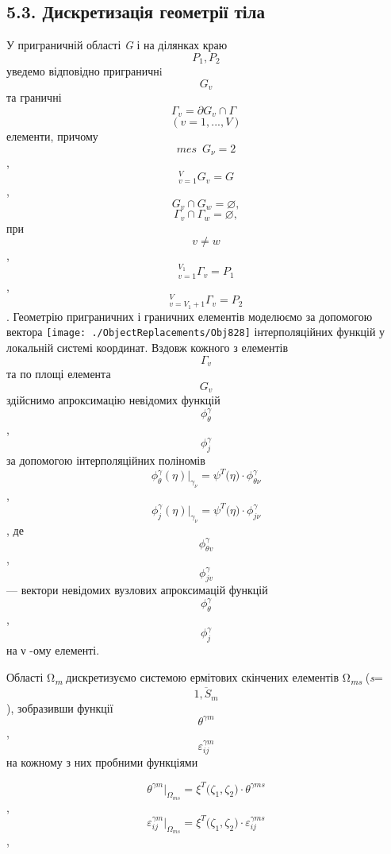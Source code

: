 \hypertarget{ux434ux438ux441ux43aux440ux435ux442ux438ux437ux430ux446ux456ux44f-ux433ux435ux43eux43cux435ux442ux440ux456ux457-ux442ux456ux43bux430-1}{%
\subsection[5.3. Дискретизація геометрії
тіла]{\texorpdfstring{\protect\hypertarget{anchor-63}{}{}5.3.
Дискретизація геометрії
тіла}{5.3. Дискретизація геометрії тіла}}\label{ux434ux438ux441ux43aux440ux435ux442ux438ux437ux430ux446ux456ux44f-ux433ux435ux43eux43cux435ux442ux440ux456ux457-ux442ux456ux43bux430-1}}

У приграничній області \emph{G} і на ділянках краю
\[{P_{1},P_{2}}{}\]\textsubscript{ }уведемо відповідно пригра­нич­нi
\[G_{v}{}\] та граничні
\[{{\Gamma_{v} = \partial}{G_{v} \cap \Gamma}\mspace{9mu}}{}\]\[{({v = 1},\text{.}\text{.}\text{.},V)}{}\]\textsubscript{
}елементи, при­чому
\[{\mathit{\text{mes}}\mspace{9mu}{G_{\nu} = 2}}{}\],
\[{{}_{v = 1}^{V}{G_{v} = G}}{}\],
\[{{{G_{v} \cap G_{w}} = \varnothing},}{}\]
\[{{{\Gamma_{v} \cap \Gamma_{w}} = \varnothing},}{}\] при
\[{v \neq w}{}\], \[{{}_{v = 1}^{V_{1}}\Gamma_{v}{= P_{1}}}{}\],
\[{{}_{v = {V_{1} + 1}}^{V}\Gamma_{v}{= P_{2}}}{}\]. Геометрію
приграничних і граничних елементів моделюємо за допомогою вектора
\texttt{[image: ./ObjectReplacements/Obj828]}
інтерполяційних функцій у локальній системі координат. Вздовж кожного з
елементів \[\Gamma_{v}{}\] та по площі елемента
\[G_{v}{}\]\textsubscript{ }здійснимо апроксимацію невідомих функцій
\[\phi_{\theta}^{\gamma}{}\], \[\phi_{j}^{\gamma}{}\] за допомогою
інтерполяційних поліномів
\[{\phi_{\theta}^{\gamma}(\eta){|_{\gamma_{\nu}} = \psi^{T}}{(\eta{) \cdot \phi_{\mathit{\text{θν}}}^{\gamma}}}}{}\],
\[{\phi_{j}^{\gamma}(\eta){|_{\gamma_{\nu}} = \psi^{T}}{(\eta{) \cdot \phi_{\mathit{j\nu}}^{\gamma}}}}{}\],
де \[\phi_{\mathit{\theta v}}^{\gamma}{}\],
\[\phi_{\mathit{\text{jv}}}^{\gamma}{}\] --- вектори невідомих вузлових
апроксимацій функцій \[\phi_{\theta}^{\gamma}{}\],
\[\phi_{j}^{\gamma}{}\] на ν -ому елементі.

Області Ω\textsubscript{\emph{m}} дискретизуємо системою ермітових
скінчених елементів Ω\textsubscript{\emph{ms}}
(\emph{s}=\[\overline{1,S_{m}}{}\]), зобразивши функції
\[\theta^{\mathit{\gamma m}}{}\],
\[\varepsilon_{\mathit{\text{ij}}}^{\mathit{\gamma m}}{}\] на кожному з
них пробними функціями

\[{\theta^{\mathit{\gamma m}}{|_{\Omega_{\mathit{\text{ms}}}} = \xi^{T}}{(\zeta_{1}}{,\zeta_{2}}{) \cdot \theta^{\gamma\mathit{\text{ms}}}}}{}\],
\[{\varepsilon_{\mathit{\text{ij}}}^{\mathit{\gamma m}}{|_{\Omega_{\mathit{\text{ms}}}} = \xi^{T}}{(\zeta_{1}}{,\zeta_{2}}{) \cdot \varepsilon_{\mathit{\text{ij}}}^{\gamma\mathit{\text{ms}}}}}{}\],

